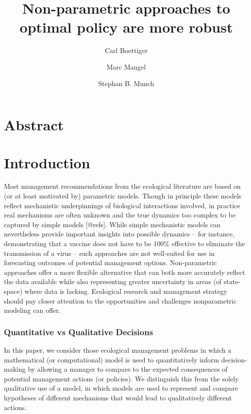 \documentclass[author-year, review]{elsarticle} %
\begin{document}
\begin{frontmatter}
  \title{Non-parametric approaches to optimal policy are more robust}
  \author[cstar]{Carl Boettiger}
  \author[cstar]{Marc Mangel}
  \author[noaa]{Stephan B. Munch}
  \address[cstar]{Center for Stock Assessment Research, Department of Applied Math and Statistics, University of California, Mail Stop SOE-2, Santa Cruz, CA 95064, USA}
  \address[noaa]{Southwest Fisheries Science Center, National Oceanic and Atmospheric Administration, 110 Shaffer Road, Santa Cruz, CA 95060, USA}
 \end{frontmatter}


\section{Abstract}

\section{Introduction}

Most management recommendations from the ecological literature are based
on (or at least motivated by) parametric models. Though in principle
these models reflect mechanistic underpinnings of biological
interactions involved, in practice real mechanisms are often unknown and
the true dynamics too complex to be captured by simple models
{[}@refs{]}. While simple mechanistic models can nevertheless provide
important insights into possible dynamics -- for instance, demonstrating
that a vaccine does not have to be 100\% effective to eliminate the
transmission of a virus -- such approaches are not well-suited for use
in forecasting outcomes of potential management options. Non-parametric
approaches offer a more flexible alternative that can both more
accurately reflect the data available while also representing greater
uncertainty in areas (of state-space) where data is lacking. Ecological
research and management strategy should pay closer attention to the
opportunities and challenges nonparametric modeling can offer.

\subsubsection{Quantitative vs Qualitative Decisions}

In this paper, we consider those ecological management problems in which
a mathematical (or computational) model is used to quantitatively inform
decision-making by allowing a manager to compare to the expected
consequences of potential management actions (or policies). We
distinguish this from the solely qualitative use of a model, in which
models are used to represent and compare hypotheses of different
mechanisms that would lead to qualitatively different actions.
\end{document}

